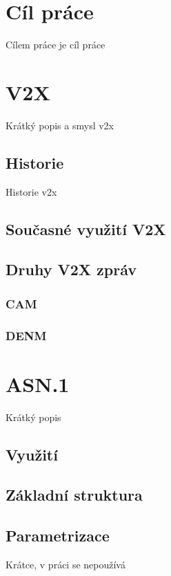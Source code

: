 \chapter{Cíl práce}

Cílem práce je cíl práce


\chapter{V2X}
Krátký popis a smysl v2x

\section{Historie}
Historie v2x

\section{Současné využití V2X}


\section{Druhy V2X zpráv}

\subsection{CAM}

\subsection{DENM}

\chapter{ASN.1}
Krátký popis

\section{Využití}

\section{Základní struktura}

\section{Parametrizace}
Krátce, v práci se nepoužívá

